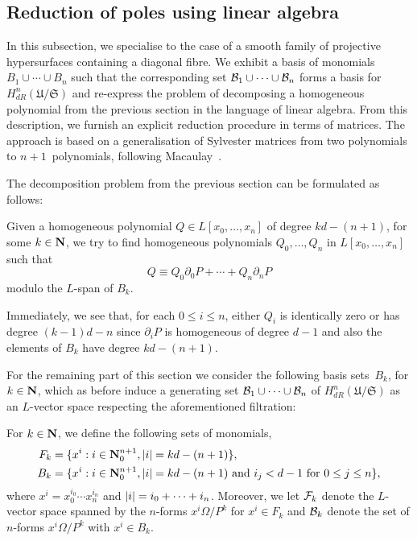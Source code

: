 \subsection{Reduction of poles using linear algebra}
\label{sec:01-05-linalg}

In this subsection, we specialise to the case of a smooth family of 
projective hypersurfaces containing a diagonal fibre.  We exhibit a basis 
of monomials $B_1 \cup \dotsb \cup B_n$ such that the corresponding set 
$\mathcal{B}_1 \cup \dotsb \cup \mathcal{B}_n$ forms a basis for 
$H_{dR}^n(\mathfrak{U}/\mathfrak{S})$ and re-express the problem of 
decomposing a homogeneous polynomial from the previous section in the 
language of linear algebra.  From this description, we furnish an 
explicit reduction procedure in terms of matrices.  The approach is 
based on a generalisation of Sylvester matrices from two polynomials to 
$n+1$~polynomials, following Macaulay~\citep{Macaulay1994}.

The decomposition problem from the previous section can be formulated as 
follows:

\begin{prob} \label{prob:Decomposition1}
Given a homogeneous polynomial $Q \in L[x_0, \dotsc, x_n]$ of degree 
$k d - (n + 1)$, for some $k \in \mathbf{N}$, we try to find homogeneous polynomials 
$Q_0, \dotsc, Q_n$ in $L[x_0, \dotsc, x_n]$ such that 
\begin{equation} \label{eq:PDecomposition1}
Q \equiv Q_0 \partial_0 P + \dotsb + Q_n \partial_n P
\end{equation}
modulo the $L$-span of $B_k$.
\end{prob}

\begin{rem}
Immediately, we see that, for each $0 \leq i \leq n$, either $Q_i$ is 
identically zero or has degree $(k - 1) d - n$ since $\partial_i P$ is 
homogeneous of degree $d - 1$ and also the elements of $B_k$ have degree 
$kd - (n+1)$.
\end{rem}

For the remaining part of this section we consider the following basis 
sets~$B_k$, for $k \in \mathbf{N}$, which as before induce a generating set 
$\mathcal{B}_1 \cup \dotsb \cup \mathcal{B}_n$ of $H_{dR}^n(\mathfrak{U}/\mathfrak{S})$ 
as an $L$-vector space respecting the aforementioned filtration:

\begin{defn} \label{defn:01-05-basis}
For $k \in \mathbf{N}$, we define the following sets of monomials, 
\begin{align*}
F_k & = \{ x^i : i \in \mathbf{N}_{0}^{n+1}, \lvert i\rvert = k d - (n+1) \}, \\
B_k & = \{ x^i : i \in \mathbf{N}_{0}^{n+1}, \lvert i\rvert = k d - (n+1) \text{ and $i_j < d-1$ for $0 \leq j \leq n$}\},
\end{align*}
where $x^i = x_0^{i_0} \dotsm x_n^{i_n}$ and 
$\lvert i\rvert = i_0 + \dotsb + i_n$.  Moreover, we let 
$\mathcal{F}_k$ denote the $L$-vector space spanned by the $n$-forms 
$x^i \Omega / P^k$ for $x^i \in F_k$ and $\mathcal{B}_k$ denote the 
set of $n$-forms $x^i \Omega / P^k$ with $x^i \in B_k$.
\end{defn}

